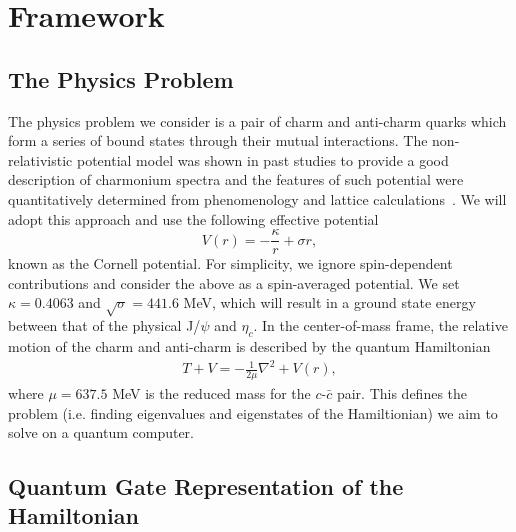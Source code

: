 \documentclass[aps,10pt,superscriptaddress,floatfix,nofootinbib,notitlepage]{revtex4-1}
\begin{document}




\section{Framework}


\subsection{The Physics Problem} 

The physics problem we consider is a pair of charm and anti-charm quarks which form a series of bound states through their mutual interactions. The non-relativistic potential model was shown in past studies to provide a good description of charmonium spectra and the features of such potential were quantitatively determined from phenomenology and lattice calculations~\cite{Bali:2000gf,Kawanai:2011jt}. We will adopt this approach and use the following effective potential
\begin{equation}
    V(r)
    =-\frac{\kappa}{r}+\sigma r,
\end{equation}
known as the Cornell potential. For simplicity, we ignore spin-dependent contributions and consider the above as a spin-averaged potential. We set $\kappa=0.4063$ and $\sqrt{\sigma}=441.6$ MeV, which will result in a ground state energy between that of the physical J/$\psi$ and $\eta_c$. In the center-of-mass frame, the relative motion of the charm and anti-charm is described by the quantum Hamiltonian
\begin{eqnarray} \label{eq_H}
T + V = -\frac{1}{2\mu}\nabla^2 + V (r),
\end{eqnarray}
where $\mu=637.5$ MeV is the reduced mass for the $c$-$\bar{c}$ pair. This defines the problem (i.e. finding eigenvalues and eigenstates of the Hamiltionian) we aim to solve on a quantum computer. 



\subsection{Quantum Gate Representation of the Hamiltonian}
\end{document}
